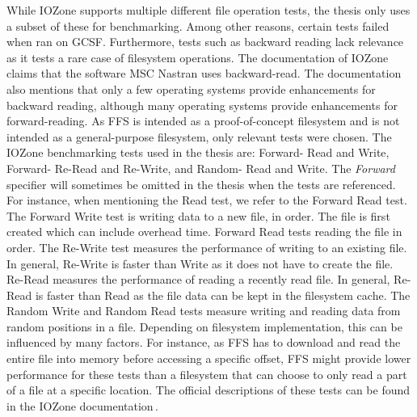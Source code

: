 While IOZone supports multiple different file operation tests, the thesis only uses a subset of these for benchmarking. Among other reasons, certain tests failed when ran on \gls{GCSF}. Furthermore, tests such as backward reading lack relevance as it tests a rare case of filesystem operations. The documentation of IOZone\,\cite{iozoneIozoneFilesystemBenchmark} claims that the software MSC Nastran uses \mbox{backward-read}. The documentation also mentions that only a few operating systems provide enhancements for backward reading, although many operating systems provide enhancements for \mbox{forward-reading}. As \gls{FFS} is intended as a \mbox{proof-of-concept} filesystem and is not intended as a \mbox{general-purpose} filesystem, only relevant tests were chosen. The IOZone benchmarking tests used in the thesis are: Forward- Read and Write, Forward- \mbox{Re-Read} and \mbox{Re-Write}, and Random- Read and Write. The \textit{Forward} specifier will sometimes be omitted in the thesis when the tests are referenced. For instance, when mentioning the Read test, we refer to the Forward Read test. The Forward Write test is writing data to a new file, in order. The file is first created which can include overhead time. Forward Read tests reading the file in order. The \mbox{Re-Write} test measures the performance of writing to an existing file. In general, \mbox{Re-Write} is faster than Write as it does not have to create the file. \mbox{Re-Read} measures the performance of reading a recently read file. In general, \mbox{Re-Read} is faster than \mbox{Read} as the file data can be kept in the filesystem cache. The Random Write and Random Read tests measure writing and reading data from random positions in a file. Depending on filesystem implementation, this can be influenced by many factors. For instance, as \gls{FFS} has to download and read the entire file into memory before accessing a specific offset, \gls{FFS} might provide lower performance for these tests than a filesystem that can choose to only read a part of a file at a specific location. The official descriptions of these tests can be found in the IOZone documentation\,\cite{iozoneIozoneFilesystemBenchmark}.

